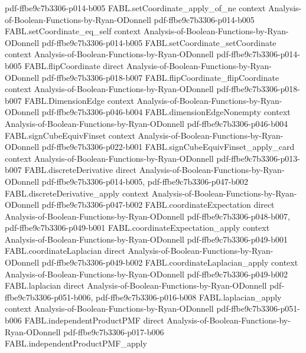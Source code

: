 \begin{theorem}
  {pdf-ffbe9c7b3306-p014-b005}
\proofstep
  {FABL.setCoordinate_apply_of_ne}
  {context}
  {Analysis-of-Boolean-Functions-by-Ryan-ODonnell}
  {pdf-ffbe9c7b3306-p014-b005}
\proofstep
  {FABL.setCoordinate_eq_self}
  {context}
  {Analysis-of-Boolean-Functions-by-Ryan-ODonnell}
  {pdf-ffbe9c7b3306-p014-b005}
\proofstep
  {FABL.setCoordinate_setCoordinate}
  {context}
  {Analysis-of-Boolean-Functions-by-Ryan-ODonnell}
  {pdf-ffbe9c7b3306-p014-b005}
\proofstep
  {FABL.flipCoordinate}
  {direct}
  {Analysis-of-Boolean-Functions-by-Ryan-ODonnell}
  {pdf-ffbe9c7b3306-p018-b007}
\proofstep
  {FABL.flipCoordinate_flipCoordinate}
  {context}
  {Analysis-of-Boolean-Functions-by-Ryan-ODonnell}
  {pdf-ffbe9c7b3306-p018-b007}
\proofstep
  {FABL.DimensionEdge}
  {context}
  {Analysis-of-Boolean-Functions-by-Ryan-ODonnell}
  {pdf-ffbe9c7b3306-p046-b004}
\proofstep
  {FABL.dimensionEdgeNonempty}
  {context}
  {Analysis-of-Boolean-Functions-by-Ryan-ODonnell}
  {pdf-ffbe9c7b3306-p046-b004}
\proofstep
  {FABL.signCubeEquivFinset}
  {context}
  {Analysis-of-Boolean-Functions-by-Ryan-ODonnell}
  {pdf-ffbe9c7b3306-p022-b001}
\proofstep
  {FABL.signCubeEquivFinset_apply_card}
  {context}
  {Analysis-of-Boolean-Functions-by-Ryan-ODonnell}
  {pdf-ffbe9c7b3306-p013-b007}
\proofstep
  {FABL.discreteDerivative}
  {direct}
  {Analysis-of-Boolean-Functions-by-Ryan-ODonnell}
  {pdf-ffbe9c7b3306-p014-b005,
    pdf-ffbe9c7b3306-p047-b002}
\proofstep
  {FABL.discreteDerivative_apply}
  {context}
  {Analysis-of-Boolean-Functions-by-Ryan-ODonnell}
  {pdf-ffbe9c7b3306-p047-b002}
\proofstep
  {FABL.coordinateExpectation}
  {direct}
  {Analysis-of-Boolean-Functions-by-Ryan-ODonnell}
  {pdf-ffbe9c7b3306-p048-b007,
    pdf-ffbe9c7b3306-p049-b001}
\proofstep
  {FABL.coordinateExpectation_apply}
  {context}
  {Analysis-of-Boolean-Functions-by-Ryan-ODonnell}
  {pdf-ffbe9c7b3306-p049-b001}
\proofstep
  {FABL.coordinateLaplacian}
  {direct}
  {Analysis-of-Boolean-Functions-by-Ryan-ODonnell}
  {pdf-ffbe9c7b3306-p049-b002}
\proofstep
  {FABL.coordinateLaplacian_apply}
  {context}
  {Analysis-of-Boolean-Functions-by-Ryan-ODonnell}
  {pdf-ffbe9c7b3306-p049-b002}
\proofstep
  {FABL.laplacian}
  {direct}
  {Analysis-of-Boolean-Functions-by-Ryan-ODonnell}
  {pdf-ffbe9c7b3306-p051-b006,
    pdf-ffbe9c7b3306-p016-b008}
\proofstep
  {FABL.laplacian_apply}
  {context}
  {Analysis-of-Boolean-Functions-by-Ryan-ODonnell}
  {pdf-ffbe9c7b3306-p051-b006}
\proofstep
  {FABL.independentProductPMF}
  {direct}
  {Analysis-of-Boolean-Functions-by-Ryan-ODonnell}
  {pdf-ffbe9c7b3306-p017-b006}
\proofstep
  {FABL.independentProductPMF_apply}

\end{theorem}
